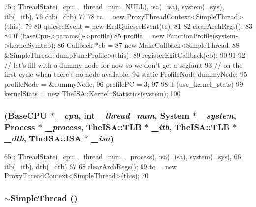 \begin{DoxyCode}
75     : ThreadState(_cpu, _thread_num, NULL), isa(_isa), system(_sys), itb(_itb),
76       dtb(_dtb)
77 {
78     tc = new ProxyThreadContext<SimpleThread>(this);
79 
80     quiesceEvent = new EndQuiesceEvent(tc);
81 
82     clearArchRegs();
83 
84     if (baseCpu->params()->profile) {
85         profile = new FunctionProfile(system->kernelSymtab);
86         Callback *cb =
87             new MakeCallback<SimpleThread,
88             &SimpleThread::dumpFuncProfile>(this);
89         registerExitCallback(cb);
90     }
91 
92     // let's fill with a dummy node for now so we don't get a segfault
93     // on the first cycle when there's no node available.
94     static ProfileNode dummyNode;
95     profileNode = &dummyNode;
96     profilePC = 3;
97 
98     if (use_kernel_stats)
99         kernelStats = new TheISA::Kernel::Statistics(system);
100 }
\end{DoxyCode}
\hypertarget{classSimpleThread_a1ed204eb6f914d3ab1f5df02379012c6}{
\subsubsection[{SimpleThread}]{ ({\bf BaseCPU} $\ast$ {\em \_\-cpu}, \/  int {\em \_\-thread\_\-num}, \/  {\bf System} $\ast$ {\em \_\-system}, \/  {\bf Process} $\ast$ {\em \_\-process}, \/  TheISA::TLB $\ast$ {\em \_\-itb}, \/  TheISA::TLB $\ast$ {\em \_\-dtb}, \/  TheISA::ISA $\ast$ {\em \_\-isa})}}
\label{classSimpleThread_a1ed204eb6f914d3ab1f5df02379012c6}



\begin{DoxyCode}
65     : ThreadState(_cpu, _thread_num, _process), isa(_isa), system(_sys),
66       itb(_itb), dtb(_dtb)
67 {
68     clearArchRegs();
69     tc = new ProxyThreadContext<SimpleThread>(this);
70 }
\end{DoxyCode}
\hypertarget{classSimpleThread_a2504f376b7b0a45d380e5af6f189458d}{
\subsubsection[{$\sim$SimpleThread}]{\setlength{\rightskip}{0pt plus 5cm}$\sim${\bf SimpleThread} ()}}
\label{classSimpleThread_a2504f376b7b0a45d380e5af6f189458d}



